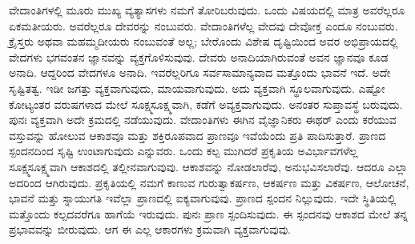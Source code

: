 ವೇದಾಂತಿಗಳಲ್ಲಿ ಮೂರು ಮುಖ್ಯ ವ್ಯತ್ಯಾಸಗಳು ನಮಗೆ ತೋರಿಬರುವುದು. ಒಂದು ವಿಷಯದಲ್ಲಿ ಮಾತ್ರ ಅವರೆಲ್ಲರೂ ಏಕಮತೀಯರು. ಅವರೆಲ್ಲರೂ ದೇವರನ್ನು ನಂಬುವರು. ವೇದಾಂತಿಗಳೆಲ್ಲ ವೇದವು ದೇವೋಕ್ತ ಎಂದೂ ನಂಬುವರು. ಕ್ರೈಸ್ತರು ಅಥವಾ ಮಹಮ್ಮದೀಯರು ನಂಬುವಂತೆ ಅಲ್ಲ; ಬೇರೊಂದು ವಿಶೇಷ ದೃಷ್ಟಿಯಿಂದ ಅವರ ಅಭಿಪ್ರಾಯದಲ್ಲಿ ವೇದಗಳು ಭಗವಂತನ ಜ್ಞಾನವನ್ನು ವ್ಯಕ್ತಗೊಳಿಸುವುವು. ದೇವರು ಅನಾದಿಯಾಗಿರುವಂತೆ ಅವನ ಜ್ಞಾನವೂ ಕೂಡ ಅನಾದಿ. ಆದ್ದರಿಂದ ವೇದಗಳೂ ಅನಾದಿ. ಇವರೆಲ್ಲರಿಗೂ ಸರ್ವಸಾಮಾನ್ಯವಾದ ಮತ್ತೊಂದು ಭಾವನೆ ಇದೆ. ಅದೇ ಸೃಷ್ಟಿತತ್ವ. ಇಡೀ ಜಗತ್ತು ವ್ಯಕ್ತವಾಗುವುದು, ಮಾಯವಾಗುವುದು. ಅದು ವ್ಯಕ್ತವಾಗಿ ಸ್ಥೂಲವಾಗುವುದು. ಎಷ್ಟೋ ಕೋಟ್ಯಂತರ ವರುಷಗಳಾದ ಮೇಲೆ ಸೂಕ್ಷ್ಮಸೂಕ್ಷ್ಮವಾಗಿ, ಕಡೆಗೆ ಅವ್ಯಕ್ತವಾಗುವುದು. ಅನಂತರ ಸುಪ್ತಾವಸ್ಥೆ ಬರುವುದು. ಪುನಃ ವ್ಯಕ್ತವಾಗಿ ಅದೇ ಕ್ರಮದಲ್ಲಿ ನಡೆಯುವುದು. ವೇದಾಂತಿಗಳು ಈಗಿನ ವೈಜ್ಞಾನಿಕರು ಈಥರ್​ ಎಂದು ಕರೆಯುವ ವಸ್ತುವನ್ನು ಹೋಲುವ ಆಕಾಶವೂ ಮತ್ತು ಶಕ್ತಿರೂಪವಾದ ಪ್ರಾಣವೂ ಇವೆಯೆಂದು ಪ್ರತಿ ಪಾದಿಸುತ್ತಾರೆ. ಪ್ರಾಣದ ಸ್ಪಂದನದಿಂದ ಸೃಷ್ಟಿ ಉಂಟಾಗುವುದು ಎನ್ನುವರು. ಒಂದು ಕಲ್ಪ ಮುಗಿದರೆ ಪ್ರಕೃತಿಯ ಅವಿರ್ಭಾವಗಳೆಲ್ಲ ಸೂಕ್ಷ್ಮಸೂಕ್ಷ್ಮವಾಗಿ ಆಕಾಶದಲ್ಲಿ ತಲ್ಲೀನವಾಗುವುವು. ಆಕಾಶವನ್ನು ನೋಡಲಾರೆವು, ಅನುಭವಿಸಲಾರೆವು. ಆದರೂ ಎಲ್ಲಾ ಅದರಿಂದ ಆಗಿರುವುದು. ಪ್ರಕೃತಿಯಲ್ಲಿ ನಮಗೆ ಕಾಣುವ ಗುರುತ್ವಾಕರ್ಷಣ, ಆಕರ್ಷಣ ಮತ್ತು ವಿಕರ್ಷಣ, ಆಲೋಚನೆ, ಭಾವನೆ ಮತ್ತು ಸ್ನಾಯುಗತಿ ಇವೆಲ್ಲಾ ಪ್ರಾಣದಲ್ಲಿ ಐಕ್ಯವಾಗುವುವು. ಪ್ರಾಣದ ಸ್ಪಂದನ ನಿಲ್ಲುವುದು. ಇದೇ ಸ್ಥಿತಿಯಲ್ಲಿ ಮತ್ತೊಂದು ಕಲ್ಪದವರೆಗೂ ಹಾಗೆಯೆ ಇರುವುದು. ಪುನಃ ಪ್ರಾಣ ಸ್ಪಂದಿಸುವುದು. ಈ ಸ್ಪಂದನವು ಆಕಾಶದ ಮೇಲೆ ತನ್ನ ಪ್ರಭಾವವನ್ನು ಬೀರುವುದು. ಆಗ ಈ ಎಲ್ಲ ಆಕಾರಗಳು ಕ್ರಮವಾಗಿ ವ್ಯಕ್ತವಾಗುವುವು.

